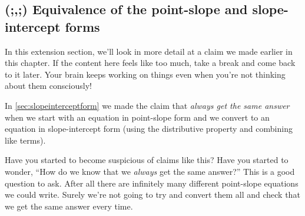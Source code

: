 %
%
%
 
\subsection{(;,;) Equivalence of the point-slope and slope-intercept forms}

In this extension section, we'll look in more detail at a claim we made earlier in this chapter. If the content here feels like too much, take a break and come back to it later. Your brain keeps working on things even when you're not thinking about them consciously!

In \cref{sec:slopeinterceptform} we made the claim that \textit{always get the same answer} when we start with an equation in point-slope form and we convert to an equation in slope-intercept form (using the distributive property and combining like terms).

Have you started to become suspicious of claims like this? Have you started to wonder, ``How do we know that we \textit{always} get the same answer?'' This is a good question to ask. After all there are infinitely many different point-slope equations we could write. Surely we're not going to try and convert them all and check that we get the same answer every time.

